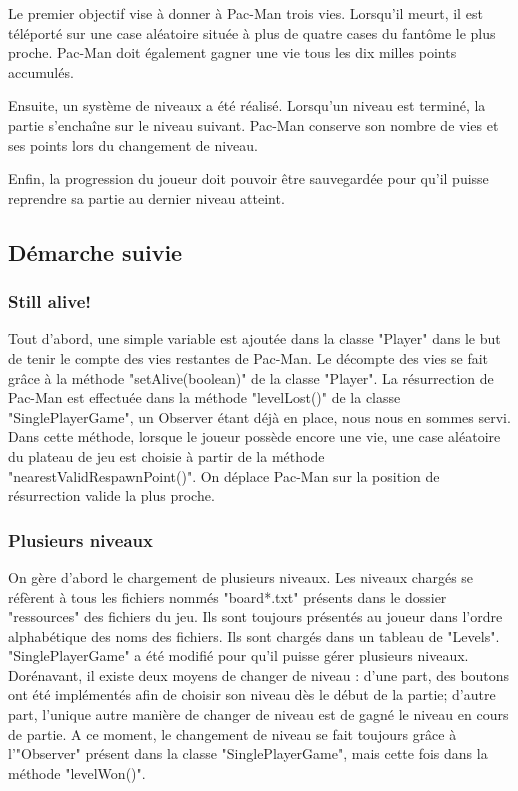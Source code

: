 \documentclass[a4paper,12pt]{report} %
\begin{document}
Le premier objectif vise à donner à Pac-Man trois vies. Lorsqu'il
meurt, il est téléporté sur une case aléatoire située à plus de quatre cases
du fantôme le plus proche. Pac-Man doit également gagner une vie tous
les dix milles points accumulés.

Ensuite, un système de niveaux a été réalisé. Lorsqu'un
niveau est terminé, la partie s'enchaîne sur le niveau suivant. Pac-Man
conserve son nombre de vies et ses points lors du changement de niveau.

Enfin, la progression du joueur doit pouvoir être sauvegardée pour
qu'il puisse reprendre sa partie au dernier niveau atteint.

\subsection{Démarche suivie}
\subsubsection{Still alive!}
Tout d'abord, une simple variable est ajoutée dans la classe "Player"
dans le but de tenir le compte des vies restantes de Pac-Man. Le décompte des
vies se fait grâce à la méthode "setAlive(boolean)" de la classe "Player".
La résurrection de Pac-Man est effectuée dans la méthode "levelLost()" de
la classe "SinglePlayerGame", un Observer étant déjà en place, nous nous en sommes servi. Dans cette méthode, lorsque le joueur possède encore une vie,
une case aléatoire du plateau de jeu est choisie à partir de la méthode "nearestValidRespawnPoint()". On déplace Pac-Man sur la position de résurrection valide la plus proche.

\subsubsection{Plusieurs niveaux}
On gère d'abord le chargement de plusieurs niveaux. Les niveaux chargés
se réfèrent à tous les fichiers nommés "board{*}.txt" présents dans le dossier
"ressources" des fichiers du jeu. Ils sont toujours présentés au joueur
dans l'ordre alphabétique des noms des fichiers. Ils sont chargés dans
un tableau de "Levels". "SinglePlayerGame" a été modifié pour qu'il puisse
gérer plusieurs niveaux. Dorénavant, il existe deux moyens de changer de niveau :
 d'une part, des boutons ont été implémentés afin de choisir son niveau dès le début de la partie; d'autre part, l'unique autre manière de changer de niveau est de gagné le niveau en cours de partie. A ce moment,
le changement de niveau se fait toujours grâce à l'"Observer" présent
dans la classe "SinglePlayerGame", mais cette fois dans la méthode "levelWon()".
\end{document}
